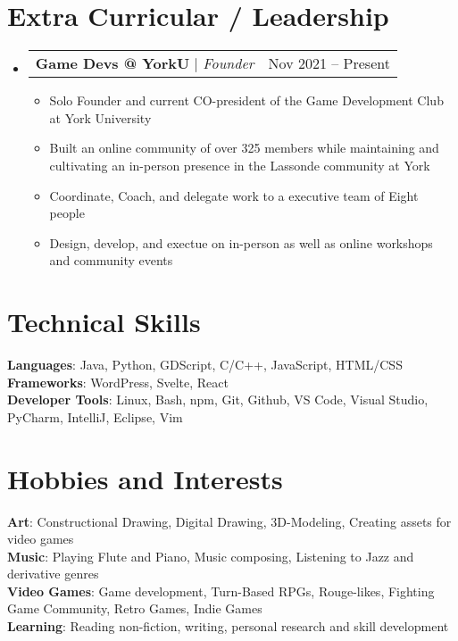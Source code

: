\documentclass[letterpaper,10pt]{article}
\makeatletter
\newcommand{\resumeItem}[1]{
  \item\small{
    {#1 \vspace{-2pt}}
  }
}
\newcommand{\resumeProjectHeading}[2]{
    \item
    \begin{tabular*}{0.97\textwidth}{l@{\extracolsep{\fill}}r}
      \small#1 & #2 \\
    \end{tabular*}\vspace{-7pt}
}
\newcommand{\resumeSubHeadingListStart}{\begin{itemize}[leftmargin=0.15in, label={}]}
\newcommand{\resumeSubHeadingListEnd}{\end{itemize}}
\newcommand{\resumeItemListStart}{\begin{itemize}}
\newcommand{\resumeItemListEnd}{\end{itemize}\vspace{-5pt}}
\makeatother
\begin{document}
\section{Extra Curricular / Leadership}
    \resumeSubHeadingListStart
      \resumeProjectHeading
          {\textbf{Game Devs @ YorkU} $|$ \emph{Founder}}{Nov 2021 -- Present}
          \resumeItemListStart
            \resumeItem{Solo Founder and current CO-president of the Game Development Club at York University}
            \resumeItem{Built an online community of over 325 members while maintaining and cultivating an in-person presence in the Lassonde community at York}
            \resumeItem{Coordinate, Coach, and delegate work to a executive team of Eight people}
            \resumeItem{Design, develop, and exectue on in-person as well as online workshops and community events}
          \resumeItemListEnd
    \resumeSubHeadingListEnd


%
\section{Technical Skills}
 \begin{itemize}[leftmargin=0.15in, label={}]
    \small{\item{
     \textbf{Languages}{: Java, Python, GDScript, C/C++, JavaScript, HTML/CSS} \\
     \textbf{Frameworks}{: WordPress, Svelte, React} \\
     \textbf{Developer Tools}{: Linux, Bash, npm, Git, Github, VS Code, Visual Studio, PyCharm, IntelliJ, Eclipse, Vim} \\
    }}
 \end{itemize}



\section{Hobbies and Interests}
 \begin{itemize}[leftmargin=0.15in, label={}]
    \small{\item{
     \textbf{Art}{: Constructional Drawing, Digital Drawing, 3D-Modeling, Creating assets for video games} \\
     \textbf{Music}{: Playing Flute and Piano, Music composing,  Listening to Jazz and derivative genres} \\
      \textbf{Video Games}{: Game development, Turn-Based RPGs, Rouge-likes, Fighting Game Community, Retro Games, Indie Games} \\
     \textbf{Learning}{: Reading non-fiction, writing, personal research and skill development} \\
    }}
 \end{itemize}


\end{document}
